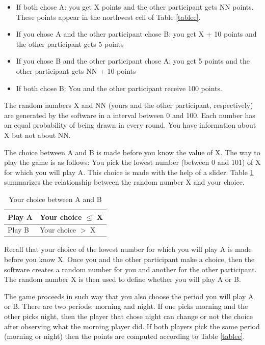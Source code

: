 \documentclass[12pt, letterpaper]{article}
\theoremstyle{plain}
\begin{document}
\begin{itemize}
\item If both chose A: you get X points and the other participant gets NN points. These points appear in the northwest cell of Table \ref{tablee}. 
\item  If you chose A and the other participant chose B:  you get X + 10 points and the other participant gets 5 points
\item  If you chose B and the other participant chose A: you get 5 points and the other participant gets NN + 10 points 
\item If both chose B: You and the other participant receive 100 points.

\end{itemize}

The random numbers X and NN (yours and the other participant, respectively) are generated by the software in a interval between 0 and 100. Each number has an equal probability of being drawn in every round. You have information about X but not about NN. 

The choice between A and B is made before you know the value of X. The way to play the game is as follows: You pick the lowest number (between 0 and 101) of X for which you will play A. This choice is made with the help of a slider. Table \ref{tableef} summarizes the relationship between the random number X and your choice. 

\begin{table}[!ht]
\centering
\begin{tabular}{l|l}
Play A & Your choice $\leq$ X \\
\hline
Play B & Your choice $>$  X  \\
\end{tabular}
\caption{Your choice between A and B}
\label{tableef}
\end{table}

Recall that your choice of the lowest number for which you will play A is made before you know X. Once you and the other participant make a choice, then the software creates a random number for you and another for the other participant. The random number X is then used to define whether you will play A or B. 

The game proceeds in such way that you also choose the period you will play A or B. There are two periods: morning and night. If one picks morning and the other picks night, then the player that chose night can change or not the choice after observing what the morning player did. If both players pick the same period (morning or night) then the points are computed according to Table \ref{tablee}. 
\end{document}
